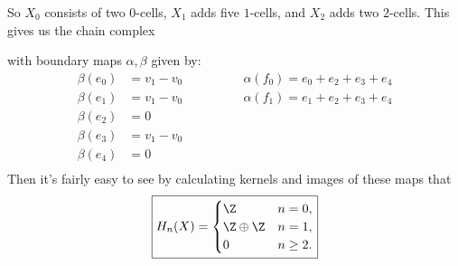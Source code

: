\documentclass[11pt,letterpaper]{article}
\begin{document}
\begin{solution}
\begin{center}
    \end{center}
    So $X_0$ consists of two $0$-cells, $X_1$ adds five $1$-cells, and $X_2$ adds two $2$-cells. This gives us the chain complex 
    \begin{center}
    \end{center}
    with boundary maps $\alpha, \beta$ given by:
    \[
        \begin{aligned}
            \beta(e_0) &= v_1 - v_0 \quad\quad\quad\quad &\alpha(f_0) = e_0+e_2+e_3+e_4\\
            \beta(e_1) &= v_1 - v_0 \quad &\alpha(f_1) = e_1+e_2+e_3+e_4\\
            \beta(e_2) &= 0\quad &\\
            \beta(e_3) &= v_1 - v_0\quad &\\
            \beta(e_4) &= 0\quad &\\
        \end{aligned}
    \]
    Then it's fairly easy to see by calculating kernels and images of these maps that
    \[
        \boxed{H_n(X) = \begin{cases}
            \Z &n=0,\\
            \Z\oplus \Z & n=1,\\
            0 & n\geq 2.\\
        \end{cases}}
    \]  
\end{solution}
\end{document}

